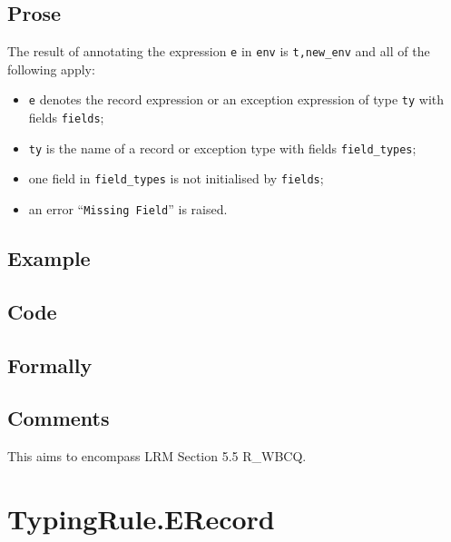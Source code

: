 \documentclass{book}
\begin{document}
  \subsection{Prose}
  The result of annotating the expression \texttt{e} in \texttt{env} is
\texttt{t,new\_env} and all of the following apply:
  \begin{itemize}
  \item \texttt{e} denotes the record expression or an exception expression of type \texttt{ty} with fields \texttt{fields};
  \item \texttt{ty} is the name of a record or exception type with fields \texttt{field\_types};
  \item one field in \texttt{field\_types} is not initialised by \texttt{fields};
  \item an error ``\texttt{Missing Field}'' is raised.
  \end{itemize}

  \subsection{Example}

  \subsection{Code}

\begin{emptyformal}
    \subsection{Formally}
\end{emptyformal}

\subsection{Comments}
  This aims to encompass LRM Section 5.5 R\_WBCQ.

\section{TypingRule.ERecord \label{sec:TypingRule.ERecord}}
\end{document}
